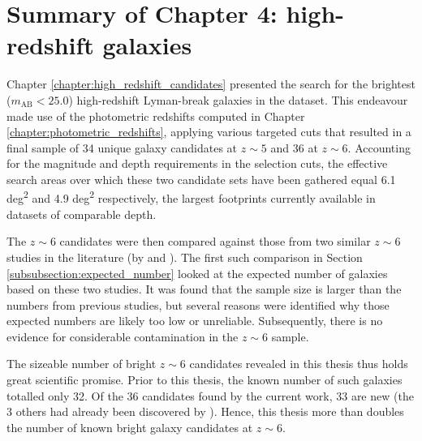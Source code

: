 \section{Summary of Chapter 4: high-redshift galaxies}
Chapter \ref{chapter:high_redshift_candidates} presented the search for the brightest ($m_{\mathrm{AB}}<25.0$) high-redshift Lyman-break galaxies in the \DESVIDEO dataset. This endeavour made use of the photometric redshifts computed in Chapter \ref{chapter:photometric_redshifts}, applying various targeted cuts that resulted in a final sample of 34 unique galaxy candidates at $z\sim5$ and 36 at $z\sim6$. Accounting for the magnitude and depth requirements in the selection cuts, the effective search areas over which these two candidate sets have been gathered equal 6.1 deg\textsuperscript{2} and 4.9 deg\textsuperscript{2} respectively, the largest footprints currently available in datasets of comparable depth. \par 


The $z\sim6$ candidates were then compared against those from two similar $z\sim6$ studies in the literature (by \citealt{2015MNRAS.452.1817B} and \citealt{2013AJ....145....4W}). The first such comparison in Section \ref{subsubsection:expected_number} looked at the expected number of galaxies based on these two studies. It was found that the \DESVIDEO sample size is larger than the numbers from previous studies, but several reasons were identified why those expected numbers are likely too low or unreliable. Subsequently, there is no evidence for considerable contamination in the $z\sim6$ sample. \par 

The sizeable number of bright $z\sim6$ \DESVIDEO candidates revealed in this thesis thus holds great scientific promise. Prior to this thesis, the known number of such galaxies totalled only 32. Of the 36 \DESVIDEO candidates found by the current work, 33 are new (the 3 others had already been discovered by \citealt{2013AJ....145....4W}). Hence, this thesis more than doubles the number of known bright galaxy candidates at $z\sim6$. \par





